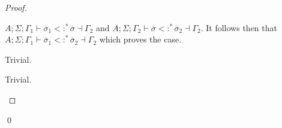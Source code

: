 \documentclass{llncs}
\numberwithin{subcase}{casethm}
\numberwithin{casethm}{theorem}
\numberwithin{casethm}{lemma}
\begin{document}
\begin{proof}
\begin{casethm}
$A; \Sigma; \Gamma_1 \vdash \overline{\sigma}_1 <:^* \overline{\sigma} \dashv \Gamma_2$ and 
$A; \Sigma; \Gamma_2 \vdash \overline{\sigma} <:^* \overline{\sigma}_2 \dashv \Gamma_2$. 
It follows then that 
$A; \Sigma; \Gamma_1 \vdash \overline{\sigma}_1 <:^* \overline{\sigma}_2 \dashv \Gamma_2$ 
which proves the case.
\end{casethm}
\begin{casethm}
Trivial.
\end{casethm}
\begin{casethm}
Trivial.
\end{casethm}
\end{proof}
\qed

\newpage
\end{document}
